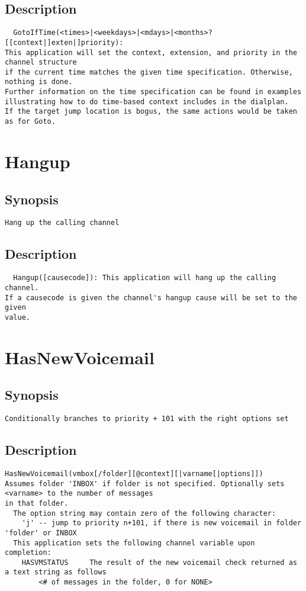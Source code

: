 \subsection{Description}
\begin{verbatim}
  GotoIfTime(<times>|<weekdays>|<mdays>|<months>?[[context|]exten|]priority):
This application will set the context, extension, and priority in the channel structure
if the current time matches the given time specification. Otherwise, nothing is done.
Further information on the time specification can be found in examples
illustrating how to do time-based context includes in the dialplan.
If the target jump location is bogus, the same actions would be taken as for Goto.

\end{verbatim}


\section{Hangup}
\subsection{Synopsis}
\begin{verbatim}
Hang up the calling channel
\end{verbatim}
\subsection{Description}
\begin{verbatim}
  Hangup([causecode]): This application will hang up the calling channel.
If a causecode is given the channel's hangup cause will be set to the given
value.

\end{verbatim}


\section{HasNewVoicemail}
\subsection{Synopsis}
\begin{verbatim}
Conditionally branches to priority + 101 with the right options set
\end{verbatim}
\subsection{Description}
\begin{verbatim}
HasNewVoicemail(vmbox[/folder][@context][|varname[|options]])
Assumes folder 'INBOX' if folder is not specified. Optionally sets <varname> to the number of messages
in that folder.
  The option string may contain zero of the following character:
	'j' -- jump to priority n+101, if there is new voicemail in folder 'folder' or INBOX
  This application sets the following channel variable upon completion:
	HASVMSTATUS		The result of the new voicemail check returned as a text string as follows
		<# of messages in the folder, 0 for NONE>

\end{verbatim}


